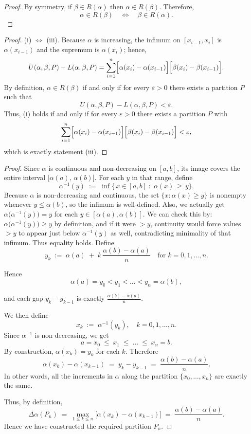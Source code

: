\documentclass[11pt]{article}
\begin{document}
\begin{exercise}{3}
\begin{proof}
By symmetry, if $\beta\in R(\alpha)$ then $\alpha\in R(\beta)$. Therefore,
\[
\alpha\in R(\beta) \quad\Longleftrightarrow\quad \beta\in R(\alpha).
\]
\end{proof}
\begin{proof}
    (i) $\iff$ (iii). Because \(\alpha\) is increasing, the infimum on \([x_{i-1},x_i]\) is \(\alpha(x_{i-1})\) and the supremum is \(\alpha(x_i)\); hence,
\[
U(\alpha,\beta,P)-L(\alpha,\beta,P)=\sum_{i=1}^n \Bigl[\alpha(x_i)-\alpha(x_{i-1})\Bigr]\Bigl[\beta(x_i)-\beta(x_{i-1})\Bigr].
\]
By definition, \(\alpha\in R(\beta)\) if and only if for every \(\varepsilon>0\) there exists a partition \(P\) such that
\[
U(\alpha,\beta,P)-L(\alpha,\beta,P) < \varepsilon.
\]
Thus, (i) holds if and only if for every \(\varepsilon>0\) there exists a partition \(P\) with
\[
\sum_{i=1}^n \Bigl[\alpha(x_i)-\alpha(x_{i-1})\Bigr]\Bigl[\beta(x_i)-\beta(x_{i-1})\Bigr] < \varepsilon,
\]
which is exactly statement (iii).
\end{proof}
\end{exercise}

\begin{exercise}{4}
    \begin{proof}
Since $\alpha$ is continuous and non-decreasing on $[a,b]$, its image covers the entire interval 
\(\bigl[\alpha(a),\,\alpha(b)\bigr]\).  For each $y$ in that range, define 
\[
\alpha^{-1}(y)
\;:=\;
\inf\{\,x \in [a,b]\;:\;\alpha(x)\,\ge\,y\}.
\]
Because $\alpha$ is non-decreasing and continuous, the set $\{x : \alpha(x) \ge y\}$ is nonempty whenever $y \le \alpha(b)$, so the infimum is well-defined. Also, we actually get $\alpha\bigl(\alpha^{-1}(y)\bigr) = y$ for each $y \in [\alpha(a), \alpha(b)]$.  We can check this by: $\alpha\bigl(\alpha^{-1}(y)\bigr)\ge y$ by definition, and if it were 
   $> y$, continuity would force values $> y$ to appear just below $\alpha^{-1}(y)$ as well, contradicting 
   minimality of that infimum.  Thus equality holds.
Define
\[
y_k
\;:=\;
\alpha(a)\;+\;k\,\frac{\alpha(b)-\alpha(a)}{n}
\quad
\text{for }k=0,1,\dots,n.
\]

Hence
\[
\alpha(a) = y_0 < y_1 < \dots < y_n = \alpha(b),
\]

and each gap $y_k - y_{k-1}$ is exactly $\frac{\alpha(b)-\alpha(a)}{n}$.

We then define
\[
x_k \;:=\; \alpha^{-1}(y_k),
\quad
k=0,1,\dots,n.
\]
Since $\alpha^{-1}$ is non-decreasing, we get 
\[
a = x_0 \;\le\; x_1 \;\le\; \dots \;\le\; x_n = b.
\]
By construction, 
\(\alpha(x_k) = y_k\) for each $k$.  Therefore
\[
\alpha(x_k) - \alpha(x_{k-1})
\;=\;
y_k - y_{k-1}
\;=\;
\frac{\alpha(b) - \alpha(a)}{n}.
\]
In other words, all the increments in $\alpha$ along the partition 
\(\{x_0,\dots,x_n\}\) are exactly the same.

Thus, by definition,
\[
\Delta \alpha(P_n)
\;=\;
\max_{1 \le k \le n}\bigl[\alpha(x_k) - \alpha(x_{k-1})\bigr]
\;=\;
\frac{\alpha(b) - \alpha(a)}{n}.
\]
Hence we have constructed the required partition $P_n$.
\end{proof}
\end{exercise}
\end{document}
